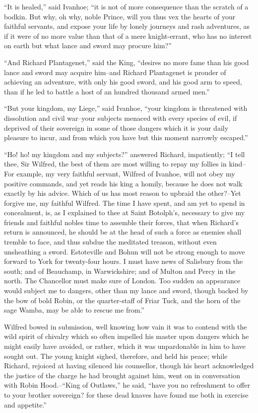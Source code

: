 ``It is healed,'' said Ivanhoe; ``it is not of more consequence than the
scratch of a bodkin. But why, oh why, noble Prince, will you thus vex
the hearts of your faithful servants, and expose your life by lonely
journeys and rash adventures, as if it were of no more value than that
of a mere knight-errant, who has no interest on earth but what lance and
sword may procure him?''

``And Richard Plantagenet,'' said the King, ``desires no more fame than
his good lance and sword may acquire him--and Richard Plantagenet is
prouder of achieving an adventure, with only his good sword, and his
good arm to speed, than if he led to battle a host of an hundred
thousand armed men.''

``But your kingdom, my Liege,'' said Ivanhoe, ``your kingdom is
threatened with dissolution and civil war--your subjects menaced with
every species of evil, if deprived of their sovereign in some of those
dangers which it is your daily pleasure to incur, and from which you
have but this moment narrowly escaped.''

``Ho! ho! my kingdom and my subjects?'' answered Richard, impatiently;
``I tell thee, Sir Wilfred, the best of them are most willing to repay
my follies in kind--For example, my very faithful servant, Wilfred of
Ivanhoe, will not obey my positive commands, and yet reads his king a
homily, because he does not walk exactly by his advice. Which of us has
most reason to upbraid the other?--Yet forgive me, my faithful Wilfred.
The time I have spent, and am yet to spend in concealment, is, as I
explained to thee at Saint Botolph's, necessary to give my friends and
faithful nobles time to assemble their forces, that when Richard's
return is announced, he should be at the head of such a force as enemies
shall tremble to face, and thus subdue the meditated treason, without
even unsheathing a sword. Estoteville and Bohun will not be strong
enough to move forward to York for twenty-four hours. I must have news
of Salisbury from the south; and of Beauchamp, in Warwickshire; and of
Multon and Percy in the north. The Chancellor must make sure of London.
Too sudden an appearance would subject me to dangers, other than my
lance and sword, though backed by the bow of bold Robin, or the
quarter-staff of Friar Tuck, and the horn of the sage Wamba, may be able
to rescue me from.''

Wilfred bowed in submission, well knowing how vain it was to contend
with the wild spirit of chivalry which so often impelled his master upon
dangers which he might easily have avoided, or rather, which it was
unpardonable in him to have sought out. The young knight sighed,
therefore, and held his peace; while Richard, rejoiced at having
silenced his counsellor, though his heart acknowledged the justice of
the charge he had brought against him, went on in conversation with
Robin Hood.--``King of Outlaws,'' he said, ``have you no refreshment to
offer to your brother sovereign? for these dead knaves have found me
both in exercise and appetite.''

